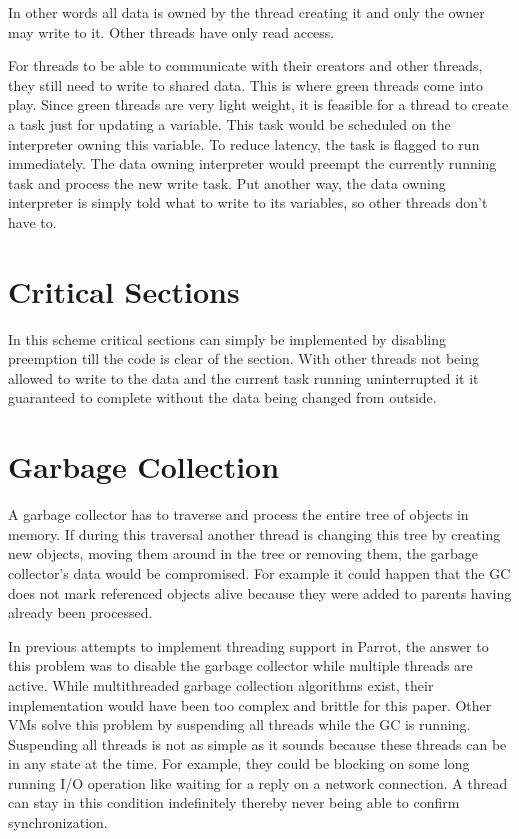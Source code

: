 \documentclass[bachelor,english]{hgbthesis}
\begin{document}
In other words all data is owned by the thread creating it and only the owner may write to it. Other threads have only read access.

For threads to be able to communicate with their creators and other threads, they still need to write to shared data. This is where green threads come into play. Since green threads are very light weight, it is feasible for a thread to create a task just for updating a variable. This task would be scheduled on the interpreter owning this variable. To reduce latency, the task is flagged to run immediately. The data owning interpreter would preempt the currently running task and process the new write task. Put another way, the data owning interpreter is simply told what to write to its variables, so other threads don't have to.

\section{Critical Sections}

In this scheme critical sections can simply be implemented by disabling preemption till the code is clear of the section. With other threads not being allowed to write to the data and the current task running uninterrupted it it guaranteed to complete without the data being changed from outside.

\section{Garbage Collection}

A garbage collector has to traverse and process the entire tree of objects in memory. If during this traversal another thread is changing this tree by creating new objects, moving them around in the tree or removing them, the garbage collector's data would be compromised. For example it could happen that the GC does not mark referenced objects alive because they were added to parents having already been processed.

In previous attempts to implement threading support in Parrot, the answer to this problem was to disable the garbage collector while multiple threads are active. While multithreaded garbage collection algorithms exist, their implementation would have been too complex and brittle for this paper\cite{VCGC}. Other VMs solve this problem by suspending all threads while the GC is running. Suspending all threads is not as simple as it sounds because these threads can be in any state at the time. For example, they could be blocking on some long running I/O operation like waiting for a reply on a network connection. A thread can stay in this condition indefinitely thereby never being able to confirm synchronization.
\end{document}
